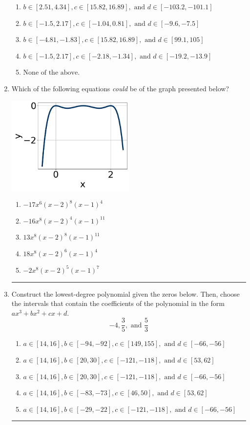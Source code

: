 \documentclass[14pt]{extbook}
\newcommand{\litem}[1]{\item#1\hspace*{-1cm}\rule{\textwidth}{0.4pt}}
\begin{document}
\begin{enumerate}
{\begin{enumerate}[label=\Alph*.]
\item \( b \in [2.51, 4.34], c \in [15.82, 16.89], \text{ and } d \in [-103.2, -101.1] \)
\item \( b \in [-1.5, 2.17], c \in [-1.04, 0.81], \text{ and } d \in [-9.6, -7.5] \)
\item \( b \in [-4.81, -1.83], c \in [15.82, 16.89], \text{ and } d \in [99.1, 105] \)
\item \( b \in [-1.5, 2.17], c \in [-2.18, -1.34], \text{ and } d \in [-19.2, -13.9] \)
\item \( \text{None of the above.} \)

\end{enumerate} }
\litem{
Which of the following equations \textit{could} be of the graph presented below?
\begin{center}
    \includegraphics[width=0.5\textwidth]{../Figures/polyGraphToFunctionCopyC.png}
\end{center}
\begin{enumerate}[label=\Alph*.]
\item \( -17x^{6} (x - 2)^{8} (x - 1)^{4} \)
\item \( -16x^{8} (x - 2)^{4} (x - 1)^{11} \)
\item \( 13x^{8} (x - 2)^{8} (x - 1)^{11} \)
\item \( 18x^{8} (x - 2)^{6} (x - 1)^{4} \)
\item \( -2x^{8} (x - 2)^{5} (x - 1)^{7} \)

\end{enumerate} }
\litem{
Construct the lowest-degree polynomial given the zeros below. Then, choose the intervals that contain the coefficients of the polynomial in the form $ax^3+bx^2+cx+d$.\[ -4, \frac{3}{5}, \text{ and } \frac{5}{3} \]\begin{enumerate}[label=\Alph*.]
\item \( a \in [14, 16], b \in [-94, -92], c \in [149, 155], \text{ and } d \in [-66, -56] \)
\item \( a \in [14, 16], b \in [20, 30], c \in [-121, -118], \text{ and } d \in [53, 62] \)
\item \( a \in [14, 16], b \in [20, 30], c \in [-121, -118], \text{ and } d \in [-66, -56] \)
\item \( a \in [14, 16], b \in [-83, -73], c \in [46, 50], \text{ and } d \in [53, 62] \)
\item \( a \in [14, 16], b \in [-29, -22], c \in [-121, -118], \text{ and } d \in [-66, -56] \)

\end{enumerate} }
\end{enumerate}
\end{document}
